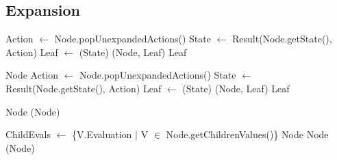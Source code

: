 \subsection*{Expansion}

\begin{algorithm}[H]
    \begin{algorithmic}[1]
                \State Action $\gets$ Node.popUnexpandedActions()
                \State State $\gets$ Result(Node.getState(), Action)
                \State Leaf $\gets$ (State)
                \State {}(Node, Leaf) 
            \EndWhile
            \State \Return Leaf
        \EndProcedure
    \end{algorithmic}    
\end{algorithm}

\begin{algorithm}[H]
    \begin{algorithmic}[1]
                \State \Return Node
            \EndIf
            \State Action $\gets$ Node.popUnexpandedActions()
            \State State $\gets$ Result(Node.getState(), Action)
            \State Leaf $\gets$ (State)
            \State {}(Node, Leaf) 
            \State \Return Leaf
        \EndProcedure
    \end{algorithmic}    
\end{algorithm}


\begin{algorithm}[H]
    \begin{algorithmic}[1]
                \State \Return Node
            \EndIf
            \State \Return {}(Node)
        \EndProcedure
    \end{algorithmic}    
\end{algorithm}

\begin{algorithm}[H]
    \begin{algorithmic}[1]
        \State ChildEvals $\gets$ \{V.Evaluation $|$ V $\in$ Node.getChildrenValues()\}
            \State \Return Node
            \State \Return Node
        \EndIf
        \State \Return {}(Node)
    \EndProcedure
    \end{algorithmic}    
\end{algorithm}

